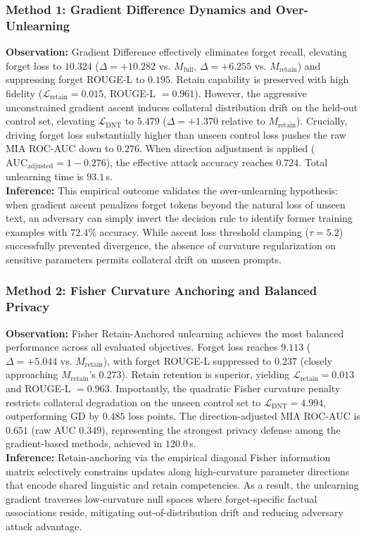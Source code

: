 \documentclass[11pt,a4paper]{article}
\begin{document}
\subsubsection{Method 1: Gradient Difference Dynamics and Over-Unlearning}
\textbf{Observation:} Gradient Difference effectively eliminates forget recall, elevating forget loss to $10.324$ ($\Delta = +10.282$ vs. $M_{\text{full}}$, $\Delta = +6.255$ vs. $M_{\text{retain}}$) and suppressing forget ROUGE-L to $0.195$. Retain capability is preserved with high fidelity ($\mathcal{L}_{\text{retain}} = 0.015$, ROUGE-L $= 0.961$). However, the aggressive unconstrained gradient ascent induces collateral distribution drift on the held-out control set, elevating $\mathcal{L}_{\text{DNT}}$ to $5.479$ ($\Delta = +1.370$ relative to $M_{\text{retain}}$). Crucially, driving forget loss substantially higher than unseen control loss pushes the raw MIA ROC-AUC down to $0.276$. When direction adjustment is applied ($\text{AUC}_{\text{adjusted}} = 1 - 0.276$), the effective attack accuracy reaches $0.724$. Total unlearning time is $93.1$\,s. \\
\textbf{Inference:} This empirical outcome validates the over-unlearning hypothesis: when gradient ascent penalizes forget tokens beyond the natural loss of unseen text, an adversary can simply invert the decision rule to identify former training examples with $72.4\%$ accuracy. While ascent loss threshold clamping ($\tau = 5.2$) successfully prevented divergence, the absence of curvature regularization on sensitive parameters permits collateral drift on unseen prompts.

\subsubsection{Method 2: Fisher Curvature Anchoring and Balanced Privacy}
\textbf{Observation:} Fisher Retain-Anchored unlearning achieves the most balanced performance across all evaluated objectives. Forget loss reaches $9.113$ ($\Delta = +5.044$ vs. $M_{\text{retain}}$), with forget ROUGE-L suppressed to $0.237$ (closely approaching $M_{\text{retain}}$'s $0.273$). Retain retention is superior, yielding $\mathcal{L}_{\text{retain}} = 0.013$ and ROUGE-L $= 0.963$. Importantly, the quadratic Fisher curvature penalty restricts collateral degradation on the unseen control set to $\mathcal{L}_{\text{DNT}} = 4.994$, outperforming GD by $0.485$ loss points. The direction-adjusted MIA ROC-AUC is $0.651$ (raw AUC $0.349$), representing the strongest privacy defense among the gradient-based methods, achieved in $120.0$\,s. \\
\textbf{Inference:} Retain-anchoring via the empirical diagonal Fisher information matrix selectively constrains updates along high-curvature parameter directions that encode shared linguistic and retain competencies. As a result, the unlearning gradient traverses low-curvature null spaces where forget-specific factual associations reside, mitigating out-of-distribution drift and reducing adversary attack advantage.
\end{document}
